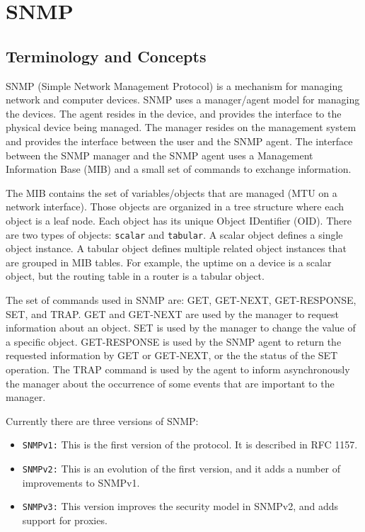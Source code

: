 %
%

\chapter{SNMP}
\label{snmp}

\section{Terminology and Concepts}

SNMP (Simple Network Management Protocol) is a mechanism for managing
network and computer devices.
SNMP uses a manager/agent model for managing the devices. The agent
resides in the device, and provides the interface to the physical device being
managed. The manager resides on the management system and provides the
interface between the user and the SNMP agent.
The interface between the SNMP manager and the SNMP agent uses a Management
Information Base (MIB) and a small set of commands to exchange information.

The MIB contains the set of variables/objects that are managed (\eg MTU on a
network interface). Those objects are organized in a tree structure where
each object is a leaf node. Each object has its unique Object IDentifier
(OID). There are two types of objects: {\tt scalar} and {\tt tabular}.
A scalar object defines a single object instance. A tabular object defines
multiple related object instances that are grouped in MIB tables.
For example, the uptime on a device is a scalar object, but the routing table
in a router is a tabular object.

The set of commands used in SNMP are: GET, GET-NEXT, GET-RESPONSE, SET, and
TRAP. GET and GET-NEXT are used by the manager to request information about
an  object. SET is used by the manager to change the value of a specific
object. GET-RESPONSE is used by the SNMP agent to return the requested
information by GET or GET-NEXT, or the the status of the SET operation.
The TRAP command is used by the agent to inform asynchronously the manager
about the occurrence of some events that are important to the manager.

Currently there are three versions of SNMP:

\begin{itemize}

  \item {\tt SNMPv1:} This is the first version of the protocol. It is
  described in RFC 1157.

  \item {\tt SNMPv2:} This is an evolution of the first version, and it adds a
  number of improvements to SNMPv1.

  \item {\tt SNMPv3:} This version improves the security model in SNMPv2, and
  adds support for proxies.

\end{itemize}


